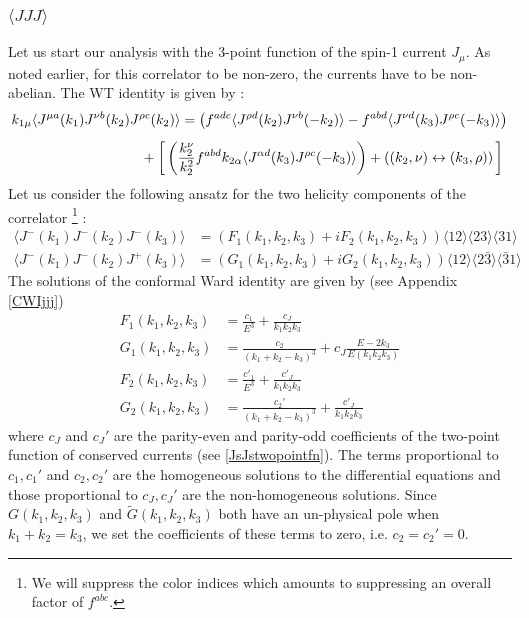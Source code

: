 \documentclass[a4paper,11pt]{article}
\begin{document}
\subsubsection{$\langle JJJ \rangle$}
Let us start our analysis with the 3-point function of the spin-1 current $J_{\mu}$. As noted earlier, for this correlator to be non-zero, the currents have to be non-abelian. The WT identity is given by \cite{Bzowski:2013sza,Bzowski:2017poo,Baumann:2020dch} :
\begin{align}
\label{WTjjj}
\begin{split}
k_{1\mu}\langle J^{\mu a}(k_1) J^{\nu b}(k_2) J^{\rho c}(k_2) \rangle &= \left(f^{adc}\langle J^{\rho d}(k_2)J^{\nu b}(-k_2) \rangle-f^{abd}\langle J^{\nu d}(k_3)J^{\rho c}(-k_3)\rangle\right)\\[5 pt]
&\hspace{-1cm}+\bigg[\left(\frac{k_2^{\nu}}{ k_2^2}f^{abd}k_{2\alpha}\langle J^{\alpha d}(k_3)J^{\rho c}(-k_3)\rangle\right)+\left((k_2, \nu) \leftrightarrow (k_3, \rho)\right)\bigg]
\end{split}
\end{align}
%
Let us consider the following ansatz for the two helicity components of the correlator \footnote{We will suppress the color indices which amounts to suppressing an overall factor of $f^{abc}$.} :
\begin{align}\label{jjjevenansatzab}
\langle J^-(k_1) J^-(k_2)J^-(k_3) \rangle &=\left(F_1(k_1, k_2, k_3)+ i F_2(k_1, k_2, k_3)\right)\langle 12 \rangle \langle 23 \rangle \langle 31 \rangle\\
\langle J^-(k_1) J^-(k_2)J^+(k_3) \rangle &=\left(G_1(k_1, k_2, k_3)+ i G_2(k_1, k_2, k_3)\right)\langle 12 \rangle \langle 2\bar{3} \rangle \langle \bar{3}1 \rangle
\end{align}
The solutions of the conformal Ward identity  are given by (see Appendix \ref{CWIjjj})
\begin{align}
F_1(k_1, k_2, k_3)&= \frac{c_1 }{E^3}+\frac{c_J}{k_1 k_2 k_3}\\[5 pt]
G_1(k_1, k_2, k_3)&=\frac{c_2 }{(k_1+k_2-k_3)^3}+ c_J \frac{E-2k_3}{E(k_1 k_2 k_3)}\\[5 pt]
F_2(k_1, k_2, k_3)&= \frac{c'_1}{E^3}+\frac{c'_J}{k_1 k_2 k_3}\\[5 pt]
G_2(k_1, k_2, k_3)&=\frac{c_2'}{(k_1+k_2-k_3)^3}+\frac{ c'_J}{k_1 k_2 k_3}\label{F1G1F2G2JJJ}
\end{align} where $c_J$ and  $c_J'$ are the parity-even and parity-odd coefficients of the two-point function of conserved currents (see \eqref{JsJstwopointfn}). 
The terms proportional to $c_1, c_1'$ and $c_2,c_2'$ are the homogeneous solutions to the differential equations and those  proportional to $c_J,c_J'$ are the non-homogeneous solutions. Since $G(k_1, k_2, k_3)$ and ${\widetilde G}(k_1, k_2, k_3) $ both have an un-physical pole when $k_1+k_2=k_3$, we set the coefficients of these terms to zero, i.e. $c_2=c_2'=0.$
\end{document}
